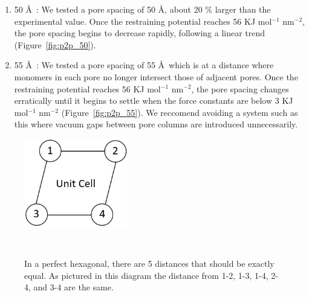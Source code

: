 \documentclass[journal=jpcbfk,manusciprt=article]{achemso}
\begin{document}
\begin{enumerate}
		\item 50 \AA~: We tested a pore spacing of 50 \AA, about 20 \%
		larger than the experimental value. Once the restraining potential reaches 56
		KJ mol$^{-1}$ nm$^{-2}$, the pore spacing begins to decrease rapidly, following
		a linear trend (Figure~\ref{fig:p2p_50}).
                
		\item 55 \AA~: We tested a pore spacing of 55 \AA~which is at
		a distance where monomers in each pore no longer intersect those of adjacent pores. Once
		the restraining potential reaches 56 KJ mol$^{-1}$ nm$^{-2}$, the pore spacing
		changes erratically until it begins to settle when the force constants are
		below 3 KJ mol$^{-1}$ nm$^{-2}$ (Figure~\ref{fig:p2p_55}). We reccomend
		avoiding a system such as this where vacuum gaps between pore columns are
		introduced unnecessarily. %

	  \end{enumerate} 

	  \begin{figure}[!htb]
		\centering
		\includegraphics[width=0.4\textwidth]{p2p_diagram.png}
		\caption{In a perfect hexagonal, there are 5 distances that should be exactly
		equal. As pictured in this diagram the distance from 1-2, 1-3, 1-4, 2-4, and 3-4
		are the same.}~\label{fig:p2p_diagram}
	  \end{figure} 
\end{document}
